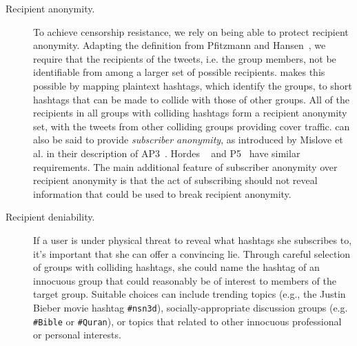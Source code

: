 \begin{description}
\item[Recipient anonymity.] To achieve censorship resistance, we rely on
  being able to protect recipient anonymity. Adapting the definition
  from Pfitzmann and Hansen~\cite{terminology}, we require that the
  recipients of the tweets, i.e. the group members, not be identifiable
  from among a larger set of possible recipients. \hoot makes this
  possible by mapping plaintext hashtags, which identify the groups, to
  short hashtags that can be made to collide with those of other
  groups. All of the recipients in all groups with colliding hashtags
  form a recipient anonymity set, with the tweets from other colliding
  groups providing cover traffic. \hoot can also be said to provide
  {\em subscriber anonymity}, as introduced by Mislove et al. in their
  description of AP3~\cite{ap3}. Hordes  ~\cite{hordes} and  P5~\cite{P5}
  have similar requirements. The main additional feature of subscriber
  anonymity over recipient anonymity is that the act of subscribing
  should not reveal information that could be used to break recipient
  anonymity.


\item[Recipient deniability.] If a \hoot user is under physical threat to
  reveal what hashtags she subscribes to, it's important that she can
  offer a convincing lie. Through careful selection of groups with
  colliding hashtags, she could name the hashtag of an innocuous group
  that could reasonably be of interest to members of the target group.
  Suitable choices can include trending topics (e.g., the Justin Bieber
  movie hashtag {\tt \#nsn3d}), socially-appropriate discussion groups
  (e.g. {\tt \#Bible} or {\tt \#Quran}), or topics that related to
  other innocuous professional or personal interests.


\end{description}
